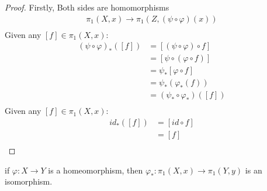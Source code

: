 \documentclass[../notes.tex]{subfiles}
\begin{document}
    \begin{proof}
        Firstly, Both sides are homomorphisms
            \begin{align*}
                \pi_1(X,x)\rightarrow\pi_1(Z,(\psi\circ\varphi)(x))\\
            \end{align*}
        Given any $[f]\in\pi_1(X,x)$:
            \begin{align*}
                (\psi\circ\varphi)_{*}([f])&=[(\psi\circ\varphi)\circ f]\\
                &=[\psi\circ(\varphi\circ f)]\\
                &=\psi_{*}[\varphi\circ f]\\
                &=\psi_{*}(\varphi_{*}(f))\\
                &=(\psi_{*}\circ\varphi_{*})([f])\\
            \end{align*}
        Given any $[f]\in\pi_1(X,x)$:
            \begin{align*}
                id_{*}([f])&=[id\circ f]\\
                &=[f]\\
            \end{align*}
    \end{proof}
    \begin{theorem} if $\varphi: X\rightarrow Y$ is a homeomorphism,
        then $\varphi_{*}: \pi_{1}(X,x)\rightarrow\pi_{1}(Y,y)$
        is an isomorphism.
    \end{theorem}
\end{document}
